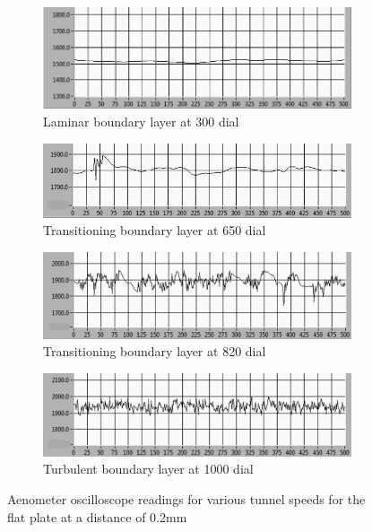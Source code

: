\documentclass{article}
\begin{document}
\begin{figure}[H]
    \centering 
    \begin{subfigure}{0.8\textwidth}
        \includegraphics[width=\textwidth]{1_laminar.jpg}
        \caption{Laminar boundary layer at 300 dial}
        \label{fig:oscilloscope_laminar}
    \end{subfigure}
    \begin{subfigure}{0.8\textwidth}
        \includegraphics[width=\textwidth]{2_transition.jpg}
        \caption{Transitioning boundary layer at 650 dial}
        \label{fig:oscilloscope_mostly_laminar}
    \end{subfigure}
    \begin{subfigure}{0.8\textwidth}
        \includegraphics[width=\textwidth]{3_transition.jpg}
        \caption{Transitioning boundary layer at 820 dial}
        \label{fig:oscilloscope_mostly_turbulent}
    \end{subfigure}
    \begin{subfigure}{0.8\textwidth}
        \includegraphics[width=\textwidth]{4_turbulent.jpg}
        \caption{Turbulent boundary layer at 1000 dial}
        \label{fig:oscilloscope_turbulent}
    \end{subfigure}
    \caption{Aenometer oscilloscope readings for various tunnel speeds for the flat plate at a distance of 0.2mm}
    \label{fig:oscilloscope}
\end{figure}
\end{document}
